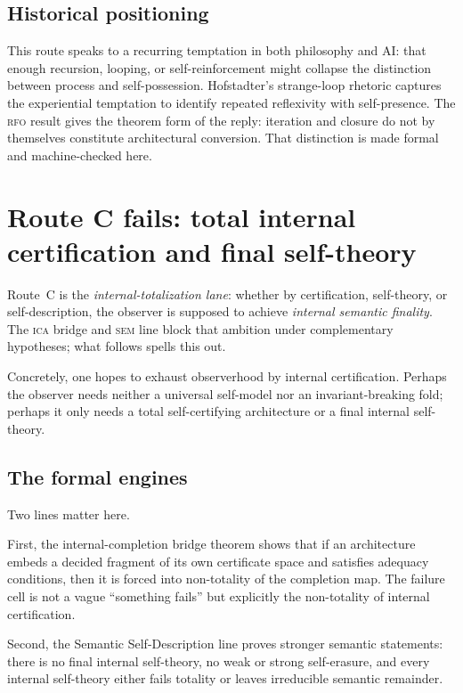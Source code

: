 \documentclass[11pt]{article}
\theoremstyle{plain}
\theoremstyle{definition}
\theoremstyle{remark}
\newcommand{\RFO}{\textsc{rfo}}
\newcommand{\ICA}{\textsc{ica}}
\newcommand{\SEM}{\textsc{sem}}
\begin{document}
\subsection*{Historical positioning}

This route speaks to a recurring temptation in both philosophy and AI: that
enough recursion, looping, or self-reinforcement might collapse the
distinction between process and self-possession.  Hofstadter's strange-loop
rhetoric captures the experiential temptation to identify repeated
reflexivity with self-presence.  The \RFO{} result gives the theorem form
of the reply: iteration and closure do not by themselves constitute
architectural conversion.  That distinction is made formal and
machine-checked here.

\section{Route C fails: total internal certification and final self-theory}
\label{sec:routeC}

Route~C is the \emph{internal-totalization lane}: whether by certification,
self-theory, or self-description, the observer is supposed to achieve
\emph{internal semantic finality}.  The \ICA{} bridge and \SEM{} line block
that ambition under complementary hypotheses; what follows spells this out.

Concretely, one hopes to exhaust observerhood by internal
certification.  Perhaps the observer needs neither a universal self-model
nor an invariant-breaking fold; perhaps it only needs a total
self-certifying architecture or a final internal self-theory.

\subsection*{The formal engines}

Two lines matter here.

First, the internal-completion bridge theorem shows that if an
architecture embeds a decided fragment of its own certificate space and
satisfies adequacy conditions, then it is forced into non-totality of the
completion map.  The failure cell is not a vague ``something fails'' but
explicitly the non-totality of internal certification.

Second, the Semantic Self-Description line proves stronger semantic
statements: there is no final internal self-theory, no weak or strong
self-erasure, and every internal self-theory either fails totality or
leaves irreducible semantic remainder.
\end{document}
